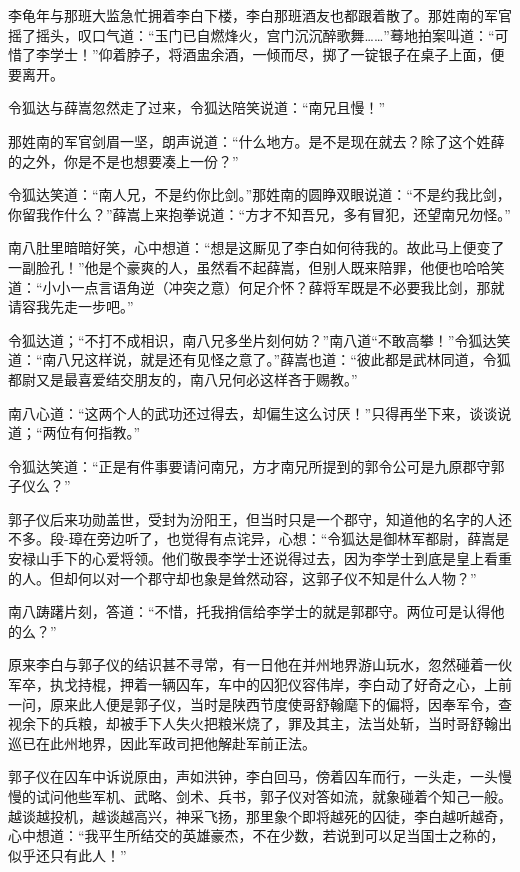 \documentclass[12pt,oneside]{book}
\begin{document}
李龟年与那班大监急忙拥着李白下楼，李白那班酒友也都跟着散了。那姓南的军官摇了摇头，叹口气道：``玉门已自燃烽火，宫门沉沉醉歌舞\ldots\ldots{}''蓦地拍案叫道：``可惜了李学士！''仰着脖子，将酒盅余酒，一倾而尽，掷了一锭银子在桌子上面，便要离开。

令狐达与薛嵩忽然走了过来，令狐达陪笑说道：``南兄且慢！''

那姓南的军官剑眉一坚，朗声说道：``什么地方。是不是现在就去？除了这个姓薛的之外，你是不是也想要凑上一份？''

令狐达笑道：``南人兄，不是约你比剑。''那姓南的圆睁双眼说道：``不是约我比剑，你留我作什么？''薛嵩上来抱拳说道：``方才不知吾兄，多有冒犯，还望南兄勿怪。''

南八肚里暗暗好笑，心中想道：``想是这厮见了李白如何待我的。故此马上便变了一副脸孔！''他是个豪爽的人，虽然看不起薛嵩，但别人既来陪罪，他便也哈哈笑道：``小小一点言语角逆（冲突之意）何足介怀？薛将军既是不必要我比剑，那就请容我先走一步吧。''

令狐达道；``不打不成相识，南八兄多坐片刻何妨？''南八道``不敢高攀！''令狐达笑道：``南八兄这样说，就是还有见怪之意了。''薛嵩也道：``彼此都是武林同道，令狐都尉又是最喜爱结交朋友的，南八兄何必这样吝于赐教。''

南八心道：``这两个人的武功还过得去，却偏生这么讨厌！''只得再坐下来，谈谈说道；``两位有何指教。''

令狐达笑道：``正是有件事要请问南兄，方才南兄所提到的郭令公可是九原郡守郭子仪么？''

郭子仪后来功勋盖世，受封为汾阳王，但当时只是一个郡守，知道他的名字的人还不多。段-璋在旁边听了，也觉得有点诧异，心想：``令狐达是御林军都尉，薛嵩是安禄山手下的心爱将领。他们敬畏李学士还说得过去，因为李学士到底是皇上看重的人。但却何以对一个郡守却也象是耸然动容，这郭子仪不知是什么人物？''

南八踌躇片刻，答道：``不惜，托我捎信给李学士的就是郭郡守。两位可是认得他的么？''

原来李白与郭子仪的结识甚不寻常，有一日他在并州地界游山玩水，忽然碰着一伙军卒，执戈持棍，押着一辆囚车，车中的囚犯仪容伟岸，李白动了好奇之心，上前一问，原来此人便是郭子仪，当时是陕西节度使哥舒翰麾下的偏将，因奉军令，查视余下的兵粮，却被手下人失火把粮米烧了，罪及其主，法当处斩，当时哥舒翰出巡已在此州地界，因此军政司把他解赴军前正法。

郭子仪在囚车中诉说原由，声如洪钟，李白回马，傍着囚车而行，一头走，一头慢慢的试问他些军机、武略、剑术、兵书，郭子仪对答如流，就象碰着个知己一般。越谈越投机，越谈越高兴，神采飞扬，那里象个即将越死的囚徒，李白越听越奇，心中想道：``我平生所结交的英雄豪杰，不在少数，若说到可以足当国士之称的，似乎还只有此人！''
\end{document}
